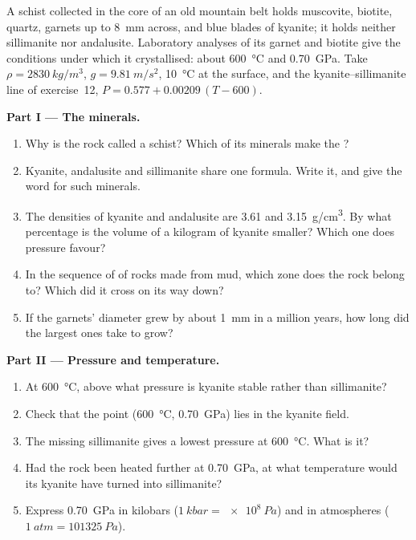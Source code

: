 \begin{problem}
\label{pb:g12:metamorphic-rocks:1}
A schist collected in the core of an old mountain belt holds muscovite,
biotite, quartz, garnets up to \qty{8}{mm} across, and blue blades of
kyanite; it holds neither sillimanite nor andalusite. Laboratory analyses of
its garnet and biotite give the conditions under which it crystallised:
about \qty{600}{\celsius} and \qty{0.70}{GPa}. Take $\rho =
\qty{2830}{kg/m^3}$, $g = \qty{9.81}{m/s^2}$, \qty{10}{\celsius} at the
surface, and the kyanite--sillimanite line of exercise~12, $P = 0.577 +
0.00209\,(T - 600)$.

\medskip
\noindent\textbf{Part I --- The minerals.}
\begin{enumerate}
  \item Why is the rock called a schist? Which of its minerals make the
        ?
  \item Kyanite, andalusite and sillimanite share one formula. Write it, and
        give the word for such minerals.
  \item The densities of kyanite and andalusite are \num{3.61} and
        \qty{3.15}{g/cm^3}. By what percentage is the volume of a kilogram of
        kyanite smaller? Which one does pressure favour?
  \item In the sequence of  of rocks made from mud, which zone
        does the rock belong to? Which  did it cross on its way down?
  \item If the garnets' diameter grew by about \qty{1}{mm} in a million
        years, how long did the largest ones take to grow?
\end{enumerate}

\medskip
\noindent\textbf{Part II --- Pressure and temperature.}
\begin{enumerate}[resume]
  \item At \qty{600}{\celsius}, above what pressure is kyanite stable rather
        than sillimanite?
  \item Check that the point (\qty{600}{\celsius}, \qty{0.70}{GPa}) lies in
        the kyanite field.
  \item The missing sillimanite gives a lowest pressure at
        \qty{600}{\celsius}. What is it?
  \item Had the rock been heated further at \qty{0.70}{GPa}, at what
        temperature would its kyanite have turned into sillimanite?
  \item Express \qty{0.70}{GPa} in kilobars ($\qty{1}{kbar} =
        \qty{e8}{Pa}$) and in atmospheres ($\qty{1}{atm} = \qty{101325}{Pa}$).
\end{enumerate}


\end{problem}
